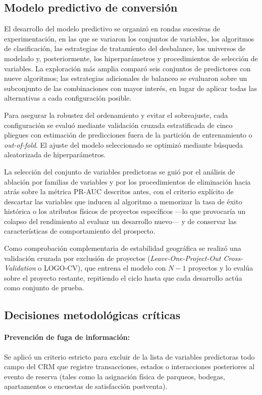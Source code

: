 \subsection{Modelo predictivo de conversión}
\label{sec:met-modelo-predictivo}
El desarrollo del modelo predictivo se organizó en rondas sucesivas de experimentación, en las que se variaron los conjuntos de variables, los algoritmos de clasificación, las estrategias de tratamiento del desbalance, los universos de modelado y, posteriormente, los hiperparámetros y procedimientos de selección de variables. La exploración más amplia comparó seis conjuntos de predictores con nueve algoritmos; las estrategias adicionales de balanceo se evaluaron sobre un subconjunto de las combinaciones con mayor interés, en lugar de aplicar todas las alternativas a cada configuración posible.

Para asegurar la robustez del ordenamiento y evitar el sobreajuste, cada configuración se evaluó mediante validación cruzada estratificada de cinco pliegues con estimación de predicciones fuera de la partición de entrenamiento o \emph{out-of-fold}. El ajuste del modelo seleccionado se optimizó mediante búsqueda aleatorizada de hiperparámetros. 

La selección del conjunto de variables predictoras se guió por el análisis de ablación por familias de variables y por los procedimientos de eliminación hacia atrás sobre la métrica PR-AUC descritos antes, con el criterio explícito de descartar las variables que inducen al algoritmo a memorizar la tasa de éxito histórica o los atributos físicos de proyectos específicos —lo que provocaría un colapso del rendimiento al evaluar un desarrollo nuevo— y de conservar las características de comportamiento del prospecto.

Como comprobación complementaria de estabilidad geográfica se realizó una validación cruzada por exclusión de proyectos (\emph{Leave-One-Project-Out Cross-Validation} o LOGO-CV), que entrena el modelo con $N-1$ proyectos y lo evalúa sobre el proyecto restante, repitiendo el ciclo hasta que cada desarrollo actúa como conjunto de prueba. 

\subsection{Decisiones metodológicas críticas}
\paragraph{Prevención de fuga de información:} Se aplicó un criterio estricto para excluir de la lista de variables predictoras todo campo del CRM que registre transacciones, estados o interacciones posteriores al evento de reserva (tales como la asignación física de parqueos, bodegas, apartamentos o encuestas de satisfacción postventa). 

